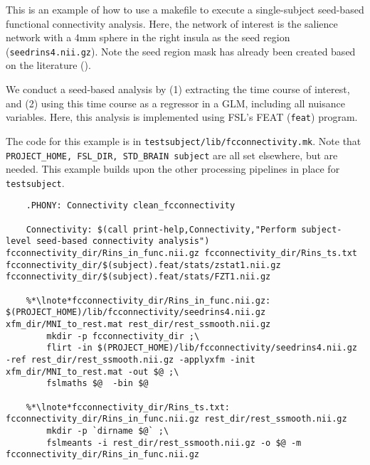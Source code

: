 \label{example:fcconnectivity}
This is an example of how to use a makefile to execute a
single-subject seed-based functional connectivity analysis. Here, the network of interest is the salience network with a 4mm sphere in the right insula as the seed region (\texttt{seedrins4.nii.gz}). Note the seed region mask has already been created based on the literature (\cite{seely2008,lee2014}).

We conduct a seed-based analysis by (1) extracting the time course of
interest, and (2) using this time course as a regressor in a GLM,
including all nuisance variables. Here, this analysis is implemented
using FSL's FEAT (\texttt{feat}) program.


The code for this example is in \texttt{testsubject/lib/fcconnectivity.mk}.
Note that \texttt{PROJECT_HOME, FSL_DIR, STD_BRAIN subject} are all set elsewhere, but are needed.  This example builds upon the other processing pipelines in place for \texttt{testsubject}.

\begin{lstlisting}
	.PHONY: Connectivity clean_fcconnectivity

	Connectivity: $(call print-help,Connectivity,"Perform subject-level seed-based connectivity analysis") fcconnectivity_dir/Rins_in_func.nii.gz fcconnectivity_dir/Rins_ts.txt fcconnectivity_dir/$(subject).feat/stats/zstat1.nii.gz fcconnectivity_dir/$(subject).feat/stats/FZT1.nii.gz

	%*\lnote*fcconnectivity_dir/Rins_in_func.nii.gz: $(PROJECT_HOME)/lib/fcconnectivity/seedrins4.nii.gz xfm_dir/MNI_to_rest.mat rest_dir/rest_ssmooth.nii.gz
		mkdir -p fcconnectivity_dir ;\
		flirt -in $(PROJECT_HOME)/lib/fcconnectivity/seedrins4.nii.gz -ref rest_dir/rest_ssmooth.nii.gz -applyxfm -init xfm_dir/MNI_to_rest.mat -out $@ ;\
		fslmaths $@  -bin $@ 
	
	%*\lnote*fcconnectivity_dir/Rins_ts.txt: fcconnectivity_dir/Rins_in_func.nii.gz rest_dir/rest_ssmooth.nii.gz
		mkdir -p `dirname $@` ;\
		fslmeants -i rest_dir/rest_ssmooth.nii.gz -o $@ -m fcconnectivity_dir/Rins_in_func.nii.gz

\end{lstlisting}

